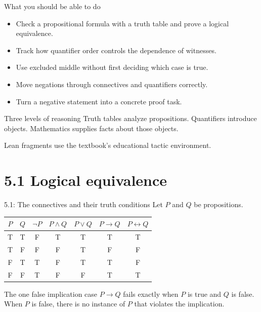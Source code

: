 

\begin{frame}\titlepage\end{frame}

\begin{frame}{What you should be able to do}
\begin{itemize}
\item Check a propositional formula with a truth table and prove a logical equivalence.
\item Track how quantifier order controls the dependence of witnesses.
\item Use excluded middle without first deciding which case is true.
\item Move negations through connectives and quantifiers correctly.
\item Turn a negative statement into a concrete proof task.
\end{itemize}
\begin{block}{Three levels of reasoning}
Truth tables analyze propositions. Quantifiers introduce objects. Mathematics supplies facts about those objects.
\end{block}
Lean fragments use the textbook's educational tactic environment.
\end{frame}

\section{5.1 Logical equivalence}
\begin{frame}{5.1: The connectives and their truth conditions}
Let $P$ and $Q$ be propositions.
\begin{center}
\begin{tabular}{cc|ccccc}
\toprule
$P$&$Q$&$\neg P$&$P\land Q$&$P\lor Q$&$P\to Q$&$P\leftrightarrow Q$\\\midrule
T&T&F&T&T&T&T\\
T&F&F&F&T&F&F\\
F&T&T&F&T&T&F\\
F&F&T&F&F&T&T\\\bottomrule
\end{tabular}
\end{center}
\begin{block}{The one false implication case}
$P\to Q$ fails exactly when $P$ is true and $Q$ is false.
When $P$ is false, there is no instance of $P$ that violates the implication.
\end{block}
\end{frame}

